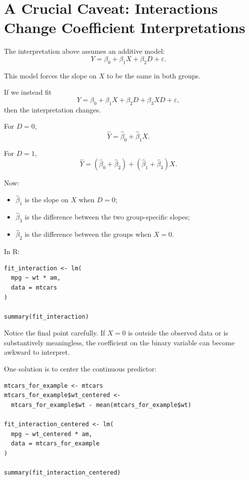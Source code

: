\documentclass[11pt]{report}
\begin{document}
\section{A Crucial Caveat: Interactions Change Coefficient Interpretations}

The interpretation above assumes an additive model:
\[
Y
=
\beta_0+\beta_1X+\beta_2D+\varepsilon.
\]

This model forces the slope on \(X\) to be the same in both groups.

If we instead fit
\[
Y
=
\beta_0+\beta_1X+\beta_2D+\beta_3XD+\varepsilon,
\]
then the interpretation changes.

For \(D=0\),
\[
\widehat{Y}
=
\widehat{\beta}_0+\widehat{\beta}_1X.
\]

For \(D=1\),
\[
\widehat{Y}
=
(\widehat{\beta}_0+\widehat{\beta}_2)
+
(\widehat{\beta}_1+\widehat{\beta}_3)X.
\]

Now:

\begin{itemize}
    \item \(\widehat{\beta}_1\) is the slope on \(X\) when \(D=0\);
    \item \(\widehat{\beta}_3\) is the difference between the two group-specific slopes;
    \item \(\widehat{\beta}_2\) is the difference between the groups when \(X=0\).
\end{itemize}

In R:

\begin{lstlisting}
fit_interaction <- lm(
  mpg ~ wt * am,
  data = mtcars
)

summary(fit_interaction)
\end{lstlisting}

Notice the final point carefully. If \(X=0\) is outside the observed data or is substantively meaningless, the coefficient on the binary variable can become awkward to interpret.

One solution is to center the continuous predictor:

\begin{lstlisting}
mtcars_for_example <- mtcars
mtcars_for_example$wt_centered <-
  mtcars_for_example$wt - mean(mtcars_for_example$wt)

fit_interaction_centered <- lm(
  mpg ~ wt_centered * am,
  data = mtcars_for_example
)

summary(fit_interaction_centered)
\end{lstlisting}
\end{document}

